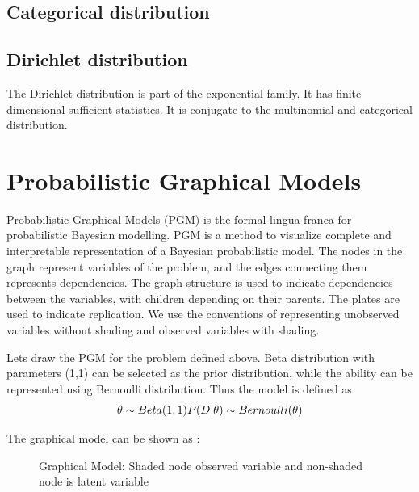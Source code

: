 \subsection*{Categorical distribution}


\subsection*{Dirichlet distribution}
The Dirichlet distribution is part of the exponential family. It has finite dimensional sufficient statistics. It is conjugate to the multinomial and categorical distribution. 





\section{Probabilistic Graphical Models}

Probabilistic Graphical Models (PGM) is the formal lingua franca for probabilistic Bayesian modelling. PGM is a method to visualize complete and interpretable representation of a Bayesian probabilistic model. The nodes in the graph represent variables of the problem, and the edges connecting them represents dependencies. The graph structure is used to indicate dependencies between the variables, with children depending on their parents. The plates are used to indicate replication. We use the conventions of representing unobserved variables without shading and observed variables with shading.

Lets draw the PGM for the problem defined above. Beta distribution with parameters (1,1) can be selected as the prior distribution, while the ability can be represented using Bernoulli distribution. Thus the model is defined as 
\begin{equation}
	\theta \sim Beta(1,1) \\
	P(D|\theta) \sim Bernoulli(\theta)
\end{equation}

The graphical model can be shown as :

\begin{figure}[!h]
\centering


\caption[Graphical Model]{Graphical Model: Shaded node observed variable and non-shaded node is latent variable}
\end{figure}

